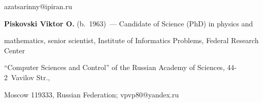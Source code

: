 \mbox{azatsarinny@ipiran.ru}


 


\vspace*{3pt}


   


\noindent


\textbf{Piskovski Viktor O.} (b.\ 1963)~--- Candidate of Science (PhD) in physics and 


mathematics, senior scientist, Institute of Informatics Problems, Federal Research Center 


``Computer Sciences and Control'' of the Russian Academy of Sciences, 44-2~Vavilov Str., 


Moscow 119333, Russian Federation; \mbox{vpvp80@yandex.ru}


\label{end\stat}








\renewcommand{\bibname}{\protect\rm Литература}


